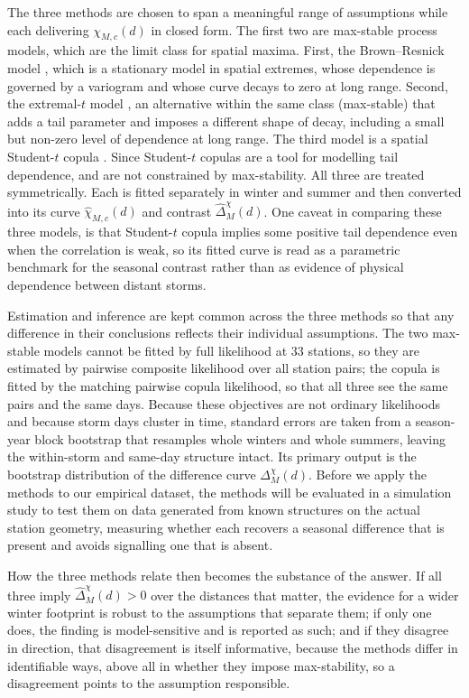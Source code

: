 The three methods are chosen to span a meaningful range of assumptions while each delivering \(\chi_{M,c}(d)\) in closed form. The first two are max-stable process models, which are the limit class for spatial maxima. First, the Brown--Resnick model \citep{brown1977,kabluchko2009}, which is a stationary model in spatial extremes, whose dependence is governed by a variogram and whose curve decays to zero at long range. Second, the extremal-\(t\) model \citep{opitz2013}, an alternative within the same class (max-stable) that adds a tail parameter and imposes a different shape of decay, including a small but non-zero level of dependence at long range. The third model is a spatial Student-\(t\) copula \citep{demarta2005}. Since Student-\(t\) copulas are a tool for modelling tail dependence, and are not constrained by max-stability. All three are treated symmetrically. Each is fitted separately in winter and summer and then converted into its curve \(\widehat\chi_{M,c}(d)\) and contrast \(\widehat\Delta_M^{\chi}(d)\). One caveat in comparing these three models, is that Student-\(t\) copula implies some positive tail dependence even when the correlation is weak, so its fitted curve is read as a parametric benchmark for the seasonal contrast rather than as evidence of physical dependence between distant storms.

Estimation and inference are kept common across the three methods so that any difference in their conclusions reflects their individual assumptions. The two max-stable models cannot be fitted by full likelihood at \(33\) stations, so they are estimated by pairwise composite likelihood over all station pairs; the copula is fitted by the matching pairwise copula likelihood, so that all three see the same pairs and the same days. Because these objectives are not ordinary likelihoods and because storm days cluster in time, standard errors are taken from a season-year block bootstrap that resamples whole winters and whole summers, leaving the within-storm and same-day structure intact. Its primary output is the bootstrap distribution of the difference curve \(\Delta_M^{\chi}(d)\). Before we apply the methods to our empirical dataset, the methods will be evaluated in a simulation study to test them on data generated from known structures on the actual station geometry, measuring whether each recovers a seasonal difference that is present and avoids signalling one that is absent.

How the three methods relate then becomes the substance of the answer. If all three imply \(\widehat\Delta_M^{\chi}(d)>0\) over the distances that matter, the evidence for a wider winter footprint is robust to the assumptions that separate them; if only one does, the finding is model-sensitive and is reported as such; and if they disagree in direction, that disagreement is itself informative, because the methods differ in identifiable ways, above all in whether they impose max-stability, so a disagreement points to the assumption responsible.

